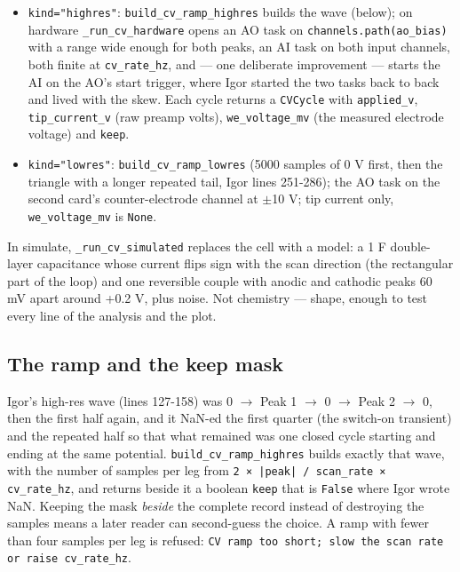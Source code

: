 \begin{itemize}[leftmargin=*]
\item \texttt{kind="highres"}: \texttt{build\_\discretionary{}{}{}cv\_\discretionary{}{}{}ramp\_\discretionary{}{}{}highres} builds the wave (below); on hardware \texttt{\_\discretionary{}{}{}run\_\discretionary{}{}{}cv\_\discretionary{}{}{}hardware} opens an AO task on \texttt{channels.\discretionary{}{}{}path(ao\_\discretionary{}{}{}bias)} with a range wide enough for both peaks, an AI task on both input channels, both finite at \texttt{cv\_\discretionary{}{}{}rate\_\discretionary{}{}{}hz}, and --- one deliberate improvement --- starts the AI on the AO's start trigger, where Igor started the two tasks back to back and lived with the skew. Each cycle returns a \texttt{CVCycle} with \texttt{applied\_\discretionary{}{}{}v}, \texttt{tip\_\discretionary{}{}{}current\_\discretionary{}{}{}v} (raw preamp volts), \texttt{we\_\discretionary{}{}{}voltage\_\discretionary{}{}{}mv} (the measured electrode voltage) and \texttt{keep}.
\item \texttt{kind="lowres"}: \texttt{build\_\discretionary{}{}{}cv\_\discretionary{}{}{}ramp\_\discretionary{}{}{}lowres} (5000 samples of 0 V first, then the triangle with a longer repeated tail, Igor lines 251-286); the AO task on the second card's counter-electrode channel at $\pm$10 V; tip current only, \texttt{we\_\discretionary{}{}{}voltage\_\discretionary{}{}{}mv} is \texttt{None}.
\end{itemize}

In simulate, \texttt{\_\discretionary{}{}{}run\_\discretionary{}{}{}cv\_\discretionary{}{}{}simulated} replaces the cell with a model: a 1 \textmu{}F double-layer capacitance whose current flips sign with the scan direction (the rectangular part of the loop) and one reversible couple with anodic and cathodic peaks 60 mV apart around +0.2 V, plus noise. Not chemistry --- shape, enough to test every line of the analysis and the plot.

\subsection{The ramp and the keep mask}

Igor's high-res wave (lines 127-158) was 0 $\rightarrow$ Peak 1 $\rightarrow$ 0 $\rightarrow$ Peak 2 $\rightarrow$ 0, then the first half again, and it NaN-ed the first quarter (the switch-on transient) and the repeated half so that what remained was one closed cycle starting and ending at the same potential. \texttt{build\_\discretionary{}{}{}cv\_\discretionary{}{}{}ramp\_\discretionary{}{}{}highres} builds exactly that wave, with the number of samples per leg from \texttt{2 × |peak| /\discretionary{}{}{} scan\_\discretionary{}{}{}rate × cv\_\discretionary{}{}{}rate\_\discretionary{}{}{}hz}, and returns beside it a boolean \texttt{keep} that is \texttt{False} where Igor wrote NaN. Keeping the mask \emph{beside} the complete record instead of destroying the samples means a later reader can second-guess the choice. A ramp with fewer than four samples per leg is refused: \texttt{CV ramp too short; slow the scan rate or raise cv\_\discretionary{}{}{}rate\_\discretionary{}{}{}hz}.

